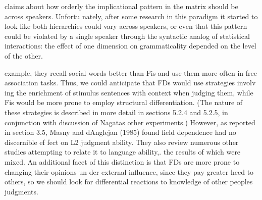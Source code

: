 \begin{styleStandard}
claims about how orderly the implicational pattern in the matrix should be across speakers. Unfortu\- nately, after some research in this paradigm it started to look like both hierarchies could vary across speakers, or even that this pattern could be violated by a single speaker through the syntactic analog of statistical interactions: the effect of one dimension on grammaticality depended on the level of the other.
\end{styleStandard}


\clearpage\setcounter{page}{1}\begin{styleTextbody}
example, they recall social words better than Fis and use them more often in free association tasks. Thus, we could anticipate that FDs would use strategies involv\- ing the enrichment of stimulus sentences with context when judging them, while Fis would be more prone to employ structural differentiation. (The nature of these strategies is described in more detail in sections 5.2.4 and 5.2.5, in conjunction with discussion of Nagata{\textquotesingle}s other experiments.) However, as reported in section 3.5, Masny and d{\textquotesingle}Anglejan (1985) found field dependence had no discernible ef\- fect on L2 judgment ability. They also review numerous other studies attempting to relate it to language ability,. the results of which were mixed. An additional facet of this distinction is that FDs are more prone to changing their opinions un\- der external influence, since they pay greater heed to others, so we should look for differential reactions to knowledge of other people{\textquotesingle}s judgments.
\end{styleTextbody}


